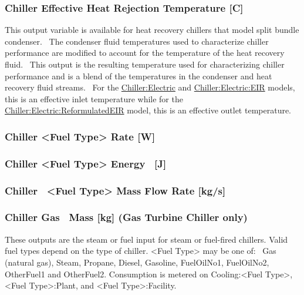 \subsubsection{Chiller Effective Heat Rejection Temperature {[}C{]}}\label{chiller-effective-heat-rejection-temperature-c}

This output variable is available for heat recovery chillers that model split bundle condenser.~ The condenser fluid temperatures used to characterize chiller performance are modified to account for the temperature of the heat recovery fluid.~ This output is the resulting temperature used for characterizing chiller performance and is a blend of the temperatures in the condenser and heat recovery fluid streams.~ For the \hyperref[chillerelectric]{Chiller:Electric} and \hyperref[chillerelectriceir]{Chiller:Electric:EIR} models, this is an effective inlet temperature while for the \hyperref[chillerelectricreformulatedeir]{Chiller:Electric:ReformulatedEIR} model, this is an effective outlet temperature.

\subsubsection{Chiller \textless{}Fuel Type\textgreater{} Rate {[}W{]}}\label{chiller-fuel-type-rate-w}

\subsubsection{Chiller \textless{}Fuel Type\textgreater{} Energy~ {[}J{]}}\label{chiller-fuel-type-energy-j}

\subsubsection{Chiller~ \textless{}Fuel Type\textgreater{} Mass Flow Rate {[}kg/s{]}}\label{chiller-fuel-type-mass-flow-rate-kgs}

\subsubsection{Chiller Gas~ Mass {[}kg{]} (Gas Turbine Chiller only)}\label{chiller-gas-mass-kg-gas-turbine-chiller-only}

These outputs are the steam or fuel input for steam or fuel-fired chillers. Valid fuel types depend on the type of chiller. \textless{}Fuel Type\textgreater{} may be one of:~ Gas (natural gas), Steam, Propane, Diesel, Gasoline, FuelOilNo1, FuelOilNo2, OtherFuel1 and OtherFuel2. Consumption is metered on Cooling:\textless{}Fuel Type\textgreater{}, \textless{}Fuel Type\textgreater{}:Plant, and \textless{}Fuel Type\textgreater{}:Facility.

